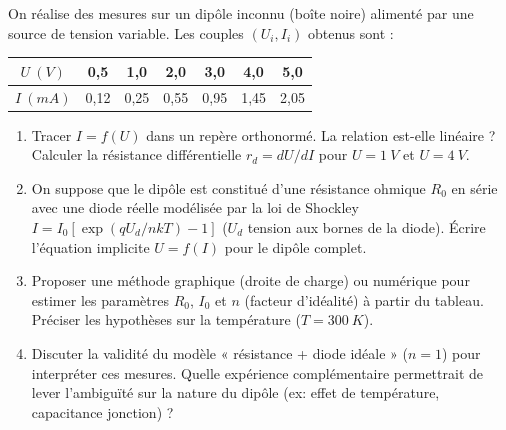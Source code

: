 \documentclass[11pt]{article}
\begin{document}
\begin{exercice}
On réalise des mesures sur un dipôle inconnu (boîte noire) alimenté par une source de tension variable. Les couples $(U_i, I_i)$ obtenus sont :
\begin{center}
\begin{tabular}{c|cccccc}
$U~(\si{V})$ & 0,5 & 1,0 & 2,0 & 3,0 & 4,0 & 5,0 \\
\hline
$I~(\si{mA})$ & 0,12 & 0,25 & 0,55 & 0,95 & 1,45 & 2,05
\end{tabular}
\end{center}
\begin{enumerate}
    \item Tracer $I=f(U)$ dans un repère orthonormé. La relation est-elle linéaire ? Calculer la résistance différentielle $r_d = dU/dI$ pour $U=\SI{1}{V}$ et $U=\SI{4}{V}$.
    \item On suppose que le dipôle est constitué d'une résistance ohmique $R_0$ en série avec une diode réelle modélisée par la loi de Shockley $I = I_0[\exp(qU_d/nkT)-1]$ ($U_d$ tension aux bornes de la diode). Écrire l'équation implicite $U = f(I)$ pour le dipôle complet.
    \item Proposer une méthode graphique (droite de charge) ou numérique pour estimer les paramètres $R_0$, $I_0$ et $n$ (facteur d'idéalité) à partir du tableau. Préciser les hypothèses sur la température ($T=\SI{300}{K}$).
    \item Discuter la validité du modèle « résistance + diode idéale » ($n=1$) pour interpréter ces mesures. Quelle expérience complémentaire permettrait de lever l'ambiguïté sur la nature du dipôle (ex: effet de température, capacitance jonction) ?
\end{enumerate}
\end{exercice}
\end{document}
